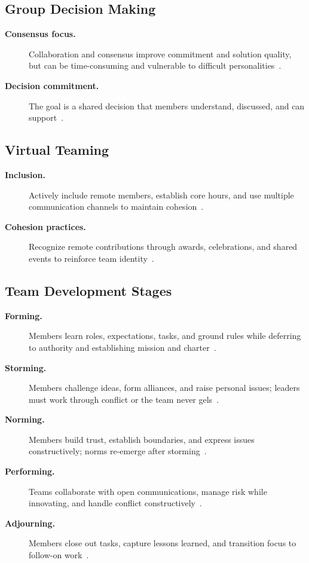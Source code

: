 \documentclass[../main.tex]{subfiles}
\begin{document}
\subsection{Group Decision Making}
\begin{description}
  \item[\textbf{Consensus focus.}] Collaboration and consensus improve commitment and solution quality, but can be time-consuming and vulnerable to difficult personalities~\autocite{edo-5-1-5-team-building-2025}.
  \item[\textbf{Decision commitment.}] The goal is a shared decision that members understand, discussed, and can support~\autocite{edo-5-1-5-team-building-2025}.
\end{description}

\subsection{Virtual Teaming}
\begin{description}
  \item[\textbf{Inclusion.}] Actively include remote members, establish core hours, and use multiple communication channels to maintain cohesion~\autocite{edo-5-1-5-team-building-2025}.
  \item[\textbf{Cohesion practices.}] Recognize remote contributions through awards, celebrations, and shared events to reinforce team identity~\autocite{edo-5-1-5-team-building-2025}.
\end{description}

\subsection{Team Development Stages}
\begin{description}
  \item[\textbf{Forming.}] Members learn roles, expectations, tasks, and ground rules while deferring to authority and establishing mission and charter~\autocite{edo-5-1-5-team-building-2025}.
  \item[\textbf{Storming.}] Members challenge ideas, form alliances, and raise personal issues; leaders must work through conflict or the team never gels~\autocite{edo-5-1-5-team-building-2025}.
  \item[\textbf{Norming.}] Members build trust, establish boundaries, and express issues constructively; norms re-emerge after storming~\autocite{edo-5-1-5-team-building-2025}.
  \item[\textbf{Performing.}] Teams collaborate with open communications, manage risk while innovating, and handle conflict constructively~\autocite{edo-5-1-5-team-building-2025}.
  \item[\textbf{Adjourning.}] Members close out tasks, capture lessons learned, and transition focus to follow-on work~\autocite{edo-5-1-5-team-building-2025}.
\end{description}
\end{document}
